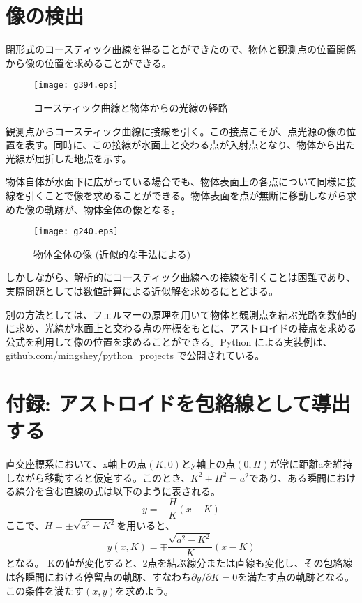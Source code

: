 \documentclass[twocolumn]{article}
\begin{document}
\section{像の検出}

閉形式のコースティック曲線を得ることができたので、物体と観測点の位置関係から像の位置を求めることができる。

\begin{figure}[h]
	\centering
	\texttt{[image: g394.eps]}
	\caption{コースティック曲線と物体からの光線の経路}
	\label{fig:caustic_raypath}
\end{figure}

観測点からコースティック曲線に接線を引く。この接点こそが、点光源の像の位置を表す。同時に、この接線が水面上と交わる点が入射点となり、物体から出た光線が屈折した地点を示す。

物体自体が水面下に広がっている場合でも、物体表面上の各点について同様に接線を引くことで像を求めることができる。物体表面を点が無断に移動しながら求めた像の軌跡が、物体全体の像となる。

\begin{figure}[h]
	\centering
	\texttt{[image: g240.eps]}
	\caption{物体全体の像 (近似的な手法による)}
	\label{fig:extended_image}
\end{figure}

しかしながら、解析的にコースティック曲線への接線を引くことは困難であり、実際問題としては数値計算による近似解を求めるにとどまる。

別の方法としては、フェルマーの原理を用いて物体と観測点を結ぶ光路を数値的に求め、光線が水面上と交わる点の座標をもとに、アストロイドの接点を求める公式を利用して像の位置を求めることができる。Python による実装例は、\href{https://github.com/mingshey/python_projects/blob/main/Refraction_Image_en.ipynb}{github.com/mingshey/python\_projects} で公開されている。

\appendix
\newcommand{\pardiff}[2]{{\frac{\partial #1}{\partial #2}}}
\newcommand{\ilpardiff}[2]{{{\partial #1}/{\partial #2}}}
\section*{付録: アストロイドを包絡線として導出する}
直交座標系において、x軸上の点$(K, 0)$とy軸上の点$(0, H)$が常に距離aを維持しながら移動すると仮定する。このとき、$K^2+H^2=a^2$であり、ある瞬間における線分を含む直線の式は以下のように表される。
$$y=-\dfrac{H}{K}(x-K)$$
ここで、$H=\pm \sqrt{a^2-K^2}$を用いると、
$$y(x, K) = \mp \dfrac{\sqrt{a^2-K^2}}{K}(x-K)$$
となる。
Kの値が変化すると、2点を結ぶ線分または直線も変化し、その包絡線は各瞬間における停留点の軌跡、すなわち$\ilpardiff{y}{K} = 0$を満たす点の軌跡となる。この条件を満たす$(x, y)$を求めよう。
\end{document}

